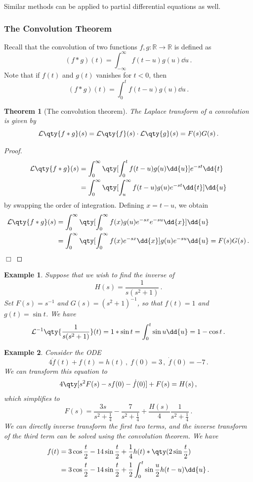 \documentclass{article}
\theoremstyle{plain}\theoremheaderfont{\normalfont\itshape}\theorembodyfont{\rmfamily}\theoremseparator{.}\newtheorem*{rem}{Remark}\newtheorem*{ex}{Example}\newtheorem*{proof}{Proof}\newtheorem*{altp}{Alternative proof}
\theoremstyle{plain}\theoremheaderfont{\normalfont\bfseries}\theorembodyfont{\rmfamily}\theoremseparator{.}\newtheorem{thm}{Theorem}[section]\newtheorem{lem}[thm]{Lemma}\newtheorem{prop}[thm]{Proposition}\newtheorem*{cor}{Corollary}\newtheorem{defn}[thm]{Definition}\newtheorem{clm}[thm]{Claim}\newtheorem{clminproof}{Claim}
\theoremstyle{break}\theoremheaderfont{\normalfont\itshape}\theorembodyfont{\rmfamily}\theoremseparator{.\medskip}\newtheorem*{proofskip}{Proof}\newtheorem*{exs}{Examples}\newtheorem*{rems}{Remarks}
\theoremstyle{break}\theoremheaderfont{\normalfont\bfseries}\theorembodyfont{\rmfamily}\theoremseparator{.\medskip}\newtheorem{lemskip}[thm]{Lemma}\newtheorem{defnskip}[thm]{Definition}\newtheorem{propskip}[thm]{Proposition}\newtheorem{thmskip}[thm]{Theorem}
\numberwithin{equation}{section}
\newcommand{\qed}{\hfill\ensuremath{\Box}}
\newcommand{\lt}[1]{\mathcal{L}\qty{ #1 }}
\begin{document}
	Similar methods can be applied to partial differential equations as well.

	\subsubsection{The Convolution Theorem}
	Recall that the convolution of two functions \(f,g:\mathbb{R}\to\mathbb{R}\) is defined as
	\[(f*g)(t)=\int_{-\infty}^{\infty}f(t-u)g(u)\dd{u}\,.\]
	Note that if \(f(t)\) and \(g(t)\) vanishes for \(t<0\), then
	\[(f*g)(t)=\int_{0}^{t}f(t-u)g(u)\dd{u}\,.\]
	\begin{thm}[The convolution theorem]
		The Laplace transform of a convolution is given by
		\[\lt{f*g}(s)=\lt{f}(s)\cdot\lt{g}(s)=F(s)G(s)\,.\]
	\end{thm}
	\begin{proof}
		\begin{align*}
			\lt{f*g}(s)&=\int_{0}^{\infty}\qty[\int_{0}^{t}f(t-u)g(u)\dd{u}]e^{-st}\dd{t}\\
			&=\int_{0}^{\infty}\qty[\int_{u}^{\infty}f(t-u)g(u)e^{-st}\dd{t}]\dd{u}
		\end{align*}
		by swapping the order of integration. Defining \(x=t-u\), we obtain
		\begin{align*}
			\lt{f*g}(s)&=\int_{0}^{\infty}\qty[\int_{0}^{\infty}f(x)g(u)e^{-sx}e^{-su}\dd{x}]\dd{u}\\
			&=\int_{0}^{\infty}\qty[\int_{0}^{\infty}f(x)e^{-sx}\dd{x}]g(u)e^{-su}\dd{u}=F(s)G(s)\,.
		\end{align*}\qed
	\end{proof}
	\begin{ex}
		Suppose that we wish to find the inverse of
		\[H(s)=\frac{1}{s(s^2+1)}\,.\]
		Set \(F(s)=s^{-1}\) and \(G(s)=(s^2+1)^{-1}\), so that \(f(t)=1\) and \(g(t)=\sin t\). We have
		\[\mathcal{L}^{-1}\qty{\frac{1}{s(s^2+1)}}(t)=1*\sin t=\int_{0}^{t}\sin u\dd{u}=1-\cos t\,.\]
	\end{ex}
	\begin{ex}
		Consider the ODE
		\[4\ddot{f}(t)+f(t)=h(t)\,,\;f(0)=3\,,\;\dot{f}(0)=-7\,.\]
		We can transform this equation to
		\[4\qty[s^2F(s)-sf(0)-\dot{f}(0)]+F(s)=H(s)\,,\]
		which simplifies to
		\[F(s)=\frac{3s}{s^2+\frac{1}{4}}-\frac{7}{s^2+\frac{1}{4}}+\frac{H(s)}{4}\frac{1}{s^2+\frac{1}{4}}\,.\]
		We can directly inverse transform the first two terms, and the inverse transform of the third term can be solved using the convolution theorem. We have
		\begin{align*}
			f(t)&=3\cos\frac{t}{2}-14\sin\frac{t}{2}+\frac{1}{4}h(t)*\qty(2\sin\frac{t}{2})\\
			&=3\cos\frac{t}{2}-14\sin\frac{t}{2}+\frac{1}{2}\int_{0}^{t}\sin\frac{u}{2}h(t-u)\dd{u}\,.
		\end{align*}
	\end{ex}
	
\end{document}
